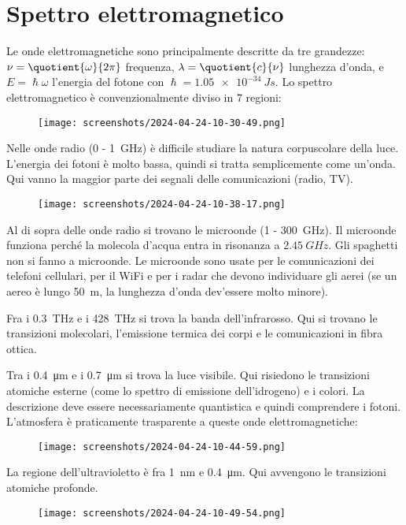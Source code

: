 \section{Spettro elettromagnetico}
Le onde elettromagnetiche sono principalmente descritte da tre grandezze: \(\nu = \quotient{\omega }{2 \pi } \) frequenza, \(\lambda = \quotient{c}{\nu } \) lunghezza d'onda, e \(E= \hslash \omega \) l'energia del fotone con \(\hslash = \SI{1.05 e-34}{J s} \). Lo spettro elettromagnetico è convenzionalmente diviso in 7 regioni:
\begin{figure}[H]
	\centering
	\texttt{[image: screenshots/2024-04-24-10-30-49.png]}
\end{figure}
Nelle onde radio (\num{0} - \SI{1}{GHz}) è difficile studiare la natura corpuscolare della luce. L'energia dei fotoni è molto bassa, quindi si tratta semplicemente come un'onda. Qui vanno la maggior parte dei segnali delle comunicazioni (radio, TV). 
\begin{figure}[H]
	\centering
	\texttt{[image: screenshots/2024-04-24-10-38-17.png]}
\end{figure}
Al di sopra delle onde radio si trovano le microonde (\num{1} - \SI{300}{GHz}). Il microonde funziona perché la molecola d'acqua entra in risonanza a \(\SI{2.45}{GHz} \). Gli spaghetti non si fanno a microonde. Le microonde sono usate per le comunicazioni dei telefoni cellulari, per il WiFi e per i radar che devono individuare gli aerei (se un aereo è lungo \SI{50}{m}, la lunghezza d'onda dev'essere molto minore).

Fra i \SI{0.3}{THz} e i \SI{428}{THz} si trova la banda dell'infrarosso. Qui si trovano le transizioni molecolari, l'emissione termica dei corpi e le comunicazioni in fibra ottica.

Tra i \SI{0.4}{\micro \metre} e i \SI{0.7}{\micro \metre} si trova la luce visibile. Qui risiedono le transizioni atomiche esterne (come lo spettro di emissione dell'idrogeno) e i colori. La descrizione deve essere necessariamente quantistica e quindi comprendere i fotoni. L'atmosfera è praticamente trasparente a queste onde elettromagnetiche:
\begin{figure}[H]
	\centering
	\texttt{[image: screenshots/2024-04-24-10-44-59.png]}
\end{figure}

La regione dell'ultravioletto è fra \SI{1}{nm} e \SI{0.4}{\micro \metre}. Qui avvengono le transizioni atomiche profonde.
\begin{figure}[H]
	\centering
	\texttt{[image: screenshots/2024-04-24-10-49-54.png]}
\end{figure}

